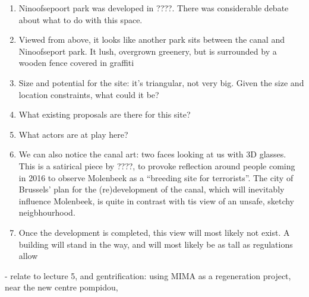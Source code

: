\documentclass{article}
\begin{document}
\begin{enumerate}
	\item Ninoofsepoort park was developed in ????. There was considerable debate about what to do with this space.
	\\ 
	\item Viewed from above, it looks like another park sits between the canal and Ninoofseport park. It lush, overgrown greenery, but is surrounded by a wooden fence covered in graffiti 
	\item Size and potential for the site: it's triangular, not very big. Given the size and location constraints, what could it be?
	\item What existing proposals are there for this site?
	\item What actors are at play here?
	\item We can also notice the canal art: two faces looking at us with 3D glasses. This is a satirical piece by ????, to provoke reflection around people coming in 2016 to observe Molenbeek as a ``breeding site for terrorists''. The city of Brussels' plan for the (re)development of the canal, which will inevitably influence Molenbeek, is quite in contrast with tis view of an unsafe, sketchy neigbhourhood.
	\item Once the development is completed, this view will most likely not exist. A building will stand in the way, and will most likely be as tall as regulations allow
	
\end{enumerate}


- relate to lecture 5, and gentrification: using MIMA as a regeneration project, near the new centre pompidou,


\pagebreak

\printbibliography 
\end{document}
